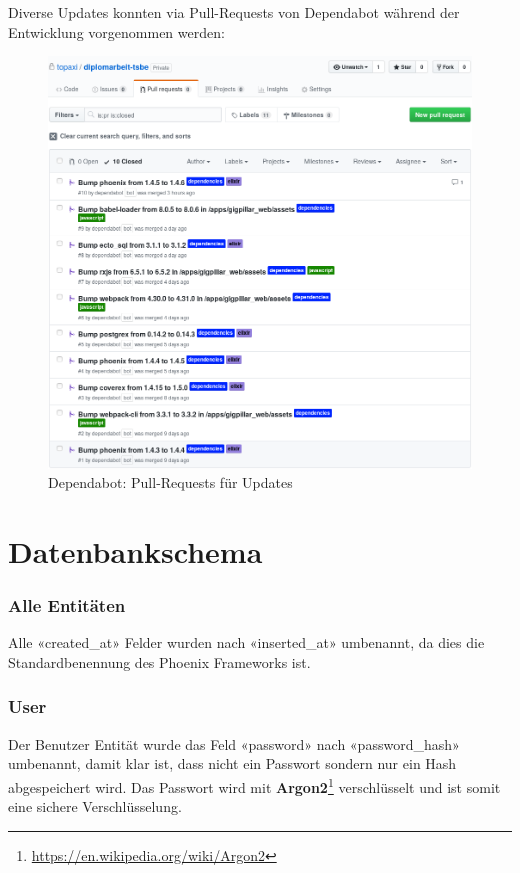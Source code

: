 \clearpage
Diverse Updates konnten via Pull-Requests von Dependabot während der Entwicklung
vorgenommen werden:

\begin{figure}[!htb]
  \centering
  \includegraphics[width=1\textwidth]{realisierung/dependabot-updates-cropped.png}
  \caption{Dependabot: Pull-Requests für Updates}
\end{figure}

\clearpage
\section{Datenbankschema}\label{RealisierungsSchema}

\subsubsection{Alle Entitäten}
Alle «created\_at» Felder wurden nach «inserted\_at» umbenannt, da dies die
Standardbenennung des Phoenix Frameworks ist.

\subsubsection{User}
Der Benutzer Entität wurde das Feld «password» nach «password\_hash» umbenannt,
damit klar ist, dass nicht ein Passwort sondern nur ein Hash abgespeichert wird.
Das Passwort wird mit \textbf{Argon2}\footnote{\url{https://en.wikipedia.org/wiki/Argon2}}
verschlüsselt und ist somit eine sichere Verschlüsselung.

